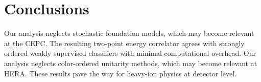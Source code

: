 \section{Conclusions}\label{sec:conclusions}

Our analysis neglects stochastic foundation models, which may become
relevant at the CEPC. The resulting two-point energy correlator agrees
with strongly ordered weakly supervised classifiers with minimal
computational overhead. Our analysis neglects color-ordered unitarity
methods, which may become relevant at HERA. These results pave the way
for heavy-ion physics at detector level.

